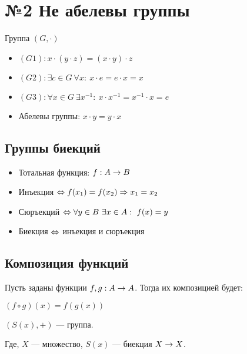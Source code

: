 \section{№2 Не абелевы группы}

\begin{reminder}
    Группа $(G, \cdot)$
    \begin{itemize}
        \item $(G1): x \cdot (y \cdot z) = (x \cdot y) \cdot z$ 
        \item $(G2): \exists c \in G \  \forall x: \ x \cdot e = e \cdot x = x$ 
        \item $(G3): \forall x \in G \  \exists x^{-1}: \ x \cdot x^{-1} = x^{-1} \cdot x = e$ 
        \item Абелевы группы: $x \cdot y = y \cdot x$
        \end{itemize}

\end{reminder}

\subsection{Группы биекций}

\begin{itemize}
    \item Тотальная функция: $f: A \rightarrow B$
    \item Инъекция $\Leftrightarrow f(x_1) = f(x_2) \Rightarrow x_1 = x_2$
    \item Сюръекций $\Leftrightarrow \forall y \in B \  \exists x \in A: \ f(x) = y$
    \item Биекция $\Leftrightarrow$ инъекция и сюръекция
\end{itemize}

\subsection{Композиция функций}

\begin{definition}
    Пусть заданы функции $f, g: A \rightarrow A$. Тогда их композицией будет:

    $(f \circ g)(x) = f(g(x))$
\end{definition}


\begin{example}
    $(S(x), +)$ --- группа.

    Где, $X$ --- множество, $S(x)$ --- биекция $X \rightarrow X$.
\end{example}




